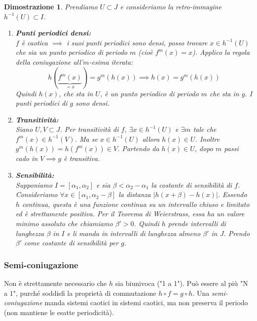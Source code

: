 \documentclass[openany]{book}
\newtheorem*{dimostrazione}{Dimostrazione}
\theoremstyle{definition}
\theoremstyle{remark}
\begin{document}
\begin{dimostrazione}
Prendiamo $U \subset J$ e consideriamo la retro-immagine $h^{-1}(U) \subset I$.
\begin{enumerate}
    \item \textbf{Punti periodici densi:} \\
    $f$ è caotica $\implies$ i suoi punti periodici sono densi, posso trovare $x \in h^{-1}(U)$ che sia un punto periodico di periodo $m$ (cioè $f^m(x) = x$).
    Applico la regola della coniugazione all'$m$-esima iterata:
    $$ h(\underbrace{f^m(x)}_{= x}) = g^m(h(x)) \implies h(x) = g^m(h(x)) $$
    Quindi $h(x)$, che sta in $U$, è un punto periodico di periodo $m$ che sta in $g$. I punti periodici di $g$ sono densi.
    
    \item \textbf{Transitività:} \\
    Siano $U, V \subset J$. Per transitività di $f$, $\exists x \in h^{-1}(U)$ e $\exists m$ tale che $f^m(x) \in h^{-1}(V)$.
    Ma se $x \in h^{-1}(U)$ allora $h(x) \in U$.
    Inoltre $g^m(h(x)) = h(f^m(x)) \in V$.
    Partendo da $h(x) \in U$, dopo $m$ passi cado in $V \implies g$ è transitiva.

    \item \textbf{Sensibilità:} \\
    Supponiamo $I = [\alpha_1, \alpha_2]$ e sia $\beta < \alpha_2 - \alpha_1$ la costante di sensibilità di $f$.
    Consideriamo $\forall x \in [\alpha_1, \alpha_2 - \beta]$ la distanza $|h(x+\beta) - h(x)|$.
    Essendo $h$ continua, questa è una funzione continua su un intervallo chiuso e limitato ed è strettamente positiva. Per il Teorema di Weierstrass, essa ha un valore minimo assoluto che chiamiamo $\beta' > 0$.
    Quindi $h$ prende intervalli di lunghezza $\beta$ in $I$ e li manda in intervalli di lunghezza almeno $\beta'$ in $J$. 
    Prendo $\beta'$ come costante di sensibilità per $g$.
\end{enumerate}
\end{dimostrazione}

\subsubsection*{Semi-coniugazione}
Non è strettamente necessario che $h$ sia biunivoca ("1 a 1"). Può essere al più "N a 1", purché soddisfi la proprietà di commutazione $h \circ f = g \circ h$.
Una \emph{semi-coniugazione} manda sistemi caotici in sistemi caotici, ma non preserva il periodo (non mantiene le esatte periodicità).
\end{document}

